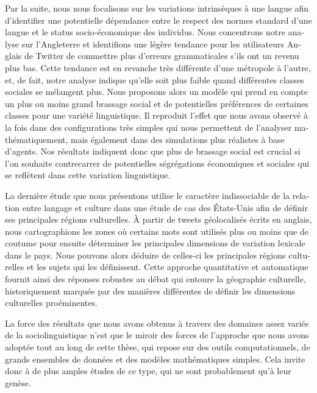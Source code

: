 \documentclass[../thesis.tex]{subfiles}
\begin{document}
\begin{otherlanguage}{french}
Par la suite, nous nous focalisons sur les variations intrinsèques à une langue afin
d'identifier une potentielle dépendance entre le respect des normes standard d'une
langue et le status socio-économique des individus. Nous concentrons notre analyse sur
l'Angleterre et identifions une légère tendance pour les utilisateurs Anglais de Twitter
de commettre plus d'erreurs grammaticales s'ils ont un revenu plus bas. Cette tendance
est en revanche très différente d'une métropole à l'autre, et, de fait, notre analyse
indique qu'elle soit plus faible quand différentes classes sociales se mélangent plus.
Nous proposons alors un modèle qui prend en compte un plus ou moins grand brassage
social et de potentielles préférences de certaines classes pour une variété
linguistique. Il reproduit l'effet que nous avons observé à la fois dans des
configurations très simples qui nous permettent de l'analyser mathématiquement, mais
également dans des simulations plus réalistes à base d'agents. Nos résultats indiquent
donc que plus de brassage social est crucial si l'on souhaite contrecarrer de
potentielles ségrégations économiques et sociales qui se reflètent dans cette variation
linguistique.

La dernière étude que nous présentons utilise le caractère indissociable de la relation
entre langage et culture dans une étude de cas des États-Unis afin de définir ses
principales régions culturelles. À partir de tweets géolocalisés écrits en anglais, nous
cartographions les zones où certains mots sont utilisés plus ou moins que de coutume
pour ensuite déterminer les principales dimensions de variation lexicale dans le pays.
Nous pouvons alors déduire de celles-ci les principales régions culturelles et les
sujets qui les définissent. Cette approche quantitative et automatique fournit ainsi des
réponses robustes au débat qui entoure la géographie culturelle, historiquement marquée
par des manières différentes de définir les dimensions culturelles proéminentes.

La force des résultats que nous avons obtenus à travers des domaines assez variés de la
sociolinguistique n'est que le miroir des forces de l'approche que nous avons adoptée
tout au long de cette thèse, qui repose sur des outils computationnels, de grands
ensembles de données et des modèles mathématiques simples. Cela invite donc à de plus
amples études de ce type, qui ne sont probablement qu'à leur genèse.
\end{otherlanguage}


\endgroup

\vfill
\end{document}
